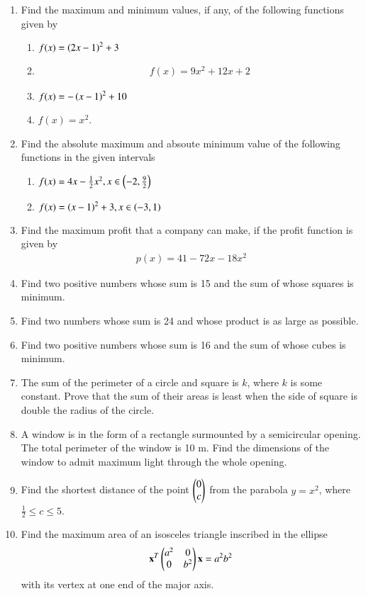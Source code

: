 \renewcommand{\theequation}{\theenumi}
\begin{enumerate}[label=\thesubsection.\arabic*.,ref=\thesubsection.\theenumi]


\item Find the maximum and minimum values, if any, of the following functions given by 
%
\begin{enumerate}
\item $f(x) = \left(2x-1\right)^2+3$
\\
\solution

\item 
\begin{align}
    f(x)=9x^2+12x+2 
\end{align}
%
\solution

\item $f(x) = -\left(x-1\right)^2+10$
\item $f(x) = x^2$.
\end{enumerate}
\item Find the absolute maximum and absoute minimum value of the following functions in the given intervals
%
\begin{enumerate}
\item $f(x) = 4x - \frac{1}{2}x^2, x \in \left(-2,\frac{9}{2}\right)$
\item $f(x) = \left(x-1\right)^2 + 3,  x \in \left(-3,1\right)$
\end{enumerate}
%
\item Find the maximum profit that a company can make, if the profit function is given by
\begin{align}
p(x) = 41-72x - 18x^2
\end{align}
%
\item Find two positive numbers whose sum is 15 and the sum of whose squares is minimum.
\item Find two numbers whose sum is 24 and whose product is as large as possible.
\item Find two positive numbers whose sum is 16 and the sum of whose cubes is minimum.
\item The sum of the perimeter of a circle and square is $k$, where $k$ is some constant. Prove that the sum of their areas is least when the side of square is double the radius of the circle.
\item A window is in the form of a rectangle surmounted by a semicircular opening. The total perimeter of the window is 10 m. Find the dimensions of the window to admit maximum light through the whole opening.

\item Find the shortest distance of the point $\begin{pmatrix}0\\c\end{pmatrix}$ from the parabola $y = x^2$, where $\frac{1}{2} \le c \le 5$.
\item Find the maximum area of an isosceles triangle inscribed in the ellipse 
%
\begin{align}
\mathbf{x}^T\begin{pmatrix}a^2 & 0 \\ 0 & b^2\end{pmatrix}\mathbf{x} = a^2b^2
\end{align}
%
with its vertex at one end of the major axis.


\end{enumerate}
%
